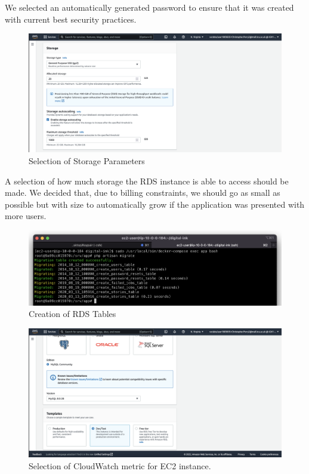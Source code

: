 We selected an automatically generated password to ensure that it was created with current best security practices.

\begin{figure}
    \centering
    \includegraphics[width=\textwidth]{resources/rds/rds-storage.png}
    \caption{Selection of Storage Parameters}
    \label{fig:rds-storage}
\end{figure}

A selection of how much storage the RDS instance is able to access should be made. We decided that, due to billing constraints, we should go as small as possible but with size to automatically grow if the application was presented with more users.

\begin{figure}
    \centering
    \includegraphics[width=\textwidth]{resources/rds/rds-tables-creation.png}
    \caption{Creation of RDS Tables}
    \label{fig:rds-tables}
\end{figure}


\begin{figure}[!htbp]
\centering
\includegraphics[width=\textwidth]{resources/rds/rds-templates.png}
\caption{Selection of CloudWatch metric for EC2 instance.}
\label{fig:rds-templates}
\end{figure}


